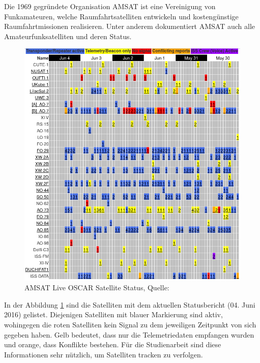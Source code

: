 \newpage
Die 1969 gegründete Organisation AMSAT ist eine Vereinigung von Funkamateuren, welche Raumfahrtsatelliten entwickeln und kostengünstige 
Raumfahrtmissionen realisieren. Unter anderem dokumentiert AMSAT auch alle Amateurfunksatelliten und deren Status. 
\begin{figure}[h]
 \centering
 \includegraphics[width=0.65\linewidth]{./images/amsatlist}
 \caption[AMSAT Live OSCAR Satellite Status]{AMSAT Live OSCAR Satellite Status, Quelle: \cite{amsat}}
 \label{fig:amsat}
\end{figure}
In der Abbildung \ref{fig:amsat} sind die Satelliten mit dem aktuellen Statusbericht (04. Juni 2016) gelistet. Diejenigen Satelliten mit blauer 
Markierung sind aktiv, wohingegen die roten Satelliten kein Signal zu dem jeweiligen Zeitpunkt von sich gegeben haben. Gelb bedeutet, dass nur die 
Telemetriedaten empfangen wurden und orange, dass Konflikte bestehen. Für die Studienarbeit sind diese Informationen sehr nützlich, um Satelliten 
tracken zu verfolgen. 
